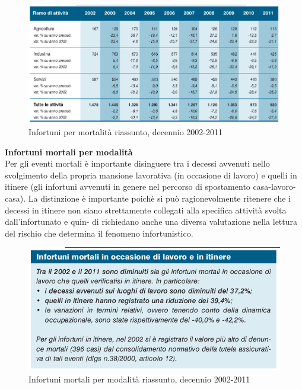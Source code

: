 \begin{figure}[H]
\centering
\includegraphics[scale=0.55]{images/analisiDiMercato/infortuniDecennioPerMortalita2}
\caption{Infortuni per mortalità riassunto, decennio 2002-2011}
\end{figure}





\textbf{Infortuni mortali per modalità}\\
Per gli eventi mortali è importante disinguere tra i decessi avvenuti nello
svolgimento della propria mansione lavorativa (in occasione di lavoro) e quelli in itinere
(gli infortuni avvenuti in genere nel percorso di spostamento casa-lavoro-casa).
La distinzione è importante poichè si può ragionevolmente ritenere che i decessi in
itinere non siano strettamente collegati alla specifica attività svolta dall’infortunato e quin-
di richiedano anche una diversa valutazione nella lettura del rischio che determina il
fenomeno infortunistico.



\begin{figure}[H]
\centering
\includegraphics[scale=0.5]{images/analisiDiMercato/infortuniDecennioMortaliPerModalita1}
\caption{Infortuni mortali per modalità riassunto, decennio 2002-2011}
\end{figure}

